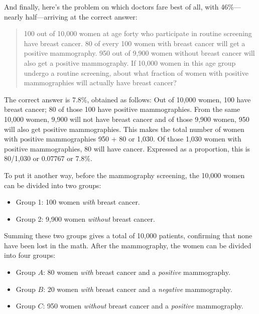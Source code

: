 { And finally, here's the problem on which doctors
fare best of all, with 46\%---nearly half---arriving at the correct
answer:

\begin{quote}
{
 100 out of 10,000 women at age forty who participate in routine
screening have breast cancer. 80 of every 100 women with breast cancer
will get a positive mammography. 950 out of 9,900 women without breast
cancer will also get a positive mammography. If 10,000 women in this
age group undergo a routine screening, about what fraction of women
with positive mammographies will actually have breast cancer?}
\end{quote}

\hr


 The correct answer is 7.8\%, obtained as follows: Out of 10,000
women, 100 have breast cancer; 80 of those 100 have positive
mammographies. From the same 10,000 women, 9,900 will not have breast
cancer and of those 9,900 women, 950 will also get positive
mammographies. This makes the total number of women with positive
mammographies 950 + 80 or 1,030. Of those 1,030 women with positive
mammographies, 80 will have cancer. Expressed as a proportion, this is
80/1,030 or 0.07767 or 7.8\%.


 To put it another way, before the mammography screening, the
10,000 women can be divided into two groups:

\begin{itemize}
\item {
 Group 1: 100 women \textit{with} breast cancer.}

\item {
 Group 2: 9,900 women \textit{without} breast cancer.}
\end{itemize}


 Summing these two groups gives a total of 10,000 patients,
confirming that none have been lost in the math. After the mammography,
the women can be divided into four groups:


\begin{itemize}
\item{
 Group $A$: 80 women \textit{with} breast cancer and a
\textit{positive} mammography.}

\item{
 Group $B$: 20 women \textit{with} breast cancer and a
\textit{negative} mammography.}

\item{
 Group $C$: 950 women \textit{without} breast cancer and a
\textit{positive} mammography.}


\end{itemize}}
